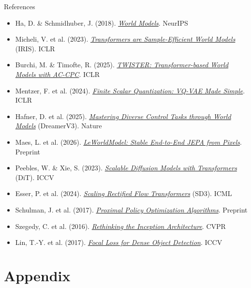 \documentclass[aspectratio=169]{beamer}
\begin{document}
\begin{frame}[allowframebreaks]{References}
  \small
  \begin{itemize}
    \item Ha, D. \& Schmidhuber, J. (2018). \href{https://arxiv.org/abs/1803.10122}{\textit{World Models}}. NeurIPS
    \item Micheli, V. et al. (2023). \href{https://arxiv.org/abs/2209.00588}{\textit{Transformers are Sample-Efficient World Models}} (IRIS). ICLR
    \item Burchi, M. \& Timofte, R. (2025). \href{https://arxiv.org/abs/2503.04416}{\textit{TWISTER: Transformer-based World Models with AC-CPC}}. ICLR
    \item Mentzer, F. et al. (2024). \href{https://arxiv.org/abs/2309.15505}{\textit{Finite Scalar Quantization: VQ-VAE Made Simple}}. ICLR
    \item Hafner, D. et al. (2025). \href{https://arxiv.org/abs/2301.04104}{\textit{Mastering Diverse Control Tasks through World Models}} (DreamerV3). Nature
    \item Maes, L. et al. (2026). \href{https://arxiv.org/abs/2603.19312}{\textit{LeWorldModel: Stable End-to-End JEPA from Pixels}}. Preprint
    \item Peebles, W. \& Xie, S. (2023). \href{https://arxiv.org/abs/2212.09748}{\textit{Scalable Diffusion Models with Transformers}} (DiT). ICCV
    \item Esser, P. et al. (2024). \href{https://arxiv.org/abs/2403.03206}{\textit{Scaling Rectified Flow Transformers}} (SD3). ICML
    \item Schulman, J. et al. (2017). \href{https://arxiv.org/abs/1707.06347}{\textit{Proximal Policy Optimization Algorithms}}. Preprint
    \item Szegedy, C. et al. (2016). \href{https://arxiv.org/abs/1512.00567}{\textit{Rethinking the Inception Architecture}}. CVPR
    \item Lin, T.-Y. et al. (2017). \href{https://arxiv.org/abs/1708.02002}{\textit{Focal Loss for Dense Object Detection}}. ICCV
  \end{itemize}
\end{frame}

\appendix
\section{Appendix}
\end{document}
